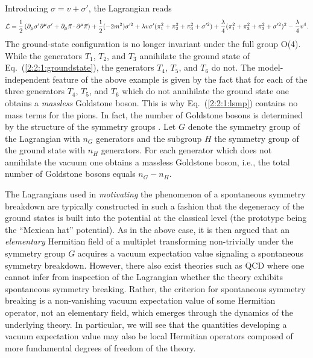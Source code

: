 \documentclass[twoside,12pt]{article}
\begin{document}
   Introducing $\sigma=v+\sigma'$, the Lagrangian reads
\begin{equation}
\label{2:2:1:lsmp}
{\cal L}=\frac{1}{2}\left(\partial_\mu\sigma'\partial^\mu\sigma'+
\partial_\mu\vec\pi\cdot\partial^\mu\vec\pi\right)
+\frac{1}{2}(-2m^2)\sigma'^2
+\lambda v\sigma' (\pi_1^2+\pi_2^2+\pi_3^2+\sigma'^2)
+\frac{\lambda}{4}(\pi_1^2+\pi_2^2+\pi_3^2+\sigma'^2)^2-\frac{\lambda}{4}v^4.
\end{equation}
   The ground-state configuration is no longer invariant under the full group
O(4).
   While the generators $T_1$, $T_2$, and $T_3$ annihilate the ground state of
Eq.~(\ref{2:2:1:groundstate}), the generators $T_4$, $T_5$, and $T_6$ do not.
   The model-independent feature of the above example is given by the
fact that for each of the three generators $T_4$, $T_5$, and $T_6$
which do not annihilate the ground state one obtains a {\em massless} Goldstone
boson.
   This is why Eq.~(\ref{2:2:1:lsmp}) contains no mass terms for the pions.
   In fact, the number of Goldstone bosons is determined by the structure of the
symmetry groups \cite{Goldstone:es:1:1}.
   Let $G$ denote the symmetry group of the Lagrangian with $n_G$ generators
and the subgroup $H$ the symmetry group of the ground state with $n_H$ generators.
   For each generator which does not annihilate the vacuum one obtains
a massless Goldstone boson, i.e., the total number of
Goldstone bosons equals $n_G-n_H$.

   The Lagrangians used in {\em motivating} the phenomenon
of a spontaneous symmetry breakdown are typically constructed in such a
fashion that the degeneracy of the ground states is built into
the potential at the classical level (the prototype being the ``Mexican hat''
potential).
   As in the above case, it is then argued that an
{\em elementary} Hermitian field of a multiplet transforming non-trivially
under the symmetry group $G$ acquires a vacuum expectation
value signaling a spontaneous symmetry breakdown.
   However, there also exist theories such as QCD where one cannot infer
from inspection of the Lagrangian whether the theory exhibits spontaneous
symmetry breaking.
   Rather, the criterion for spontaneous symmetry breaking is a non-vanishing
vacuum expectation value of some Hermitian operator, not an elementary field,
which emerges through the dynamics of the underlying theory.
   In particular, we will see that the quantities developing a vacuum
expectation value may also be local Hermitian operators composed of more
fundamental degrees of freedom of the theory.
\end{document}
